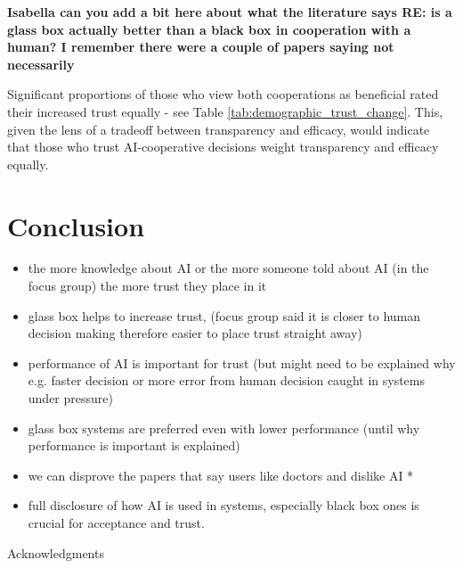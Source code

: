 \documentclass[manuscript,screen,review]{acmart}
\begin{document}
\textbf{Isabella can you add a bit here about what the literature says RE: is a glass box actually better than a black box in cooperation with a human? I remember there were a couple of papers saying not necessarily}

Significant proportions of those who view both cooperations as beneficial rated their increased trust equally - see Table \ref{tab:demographic_trust_change}. This, given the lens of a tradeoff between transparency and efficacy, would indicate that those who trust AI-cooperative decisions weight transparency and efficacy equally. 



\newpage
\section{Conclusion}

\begin{itemize}
    \item the more knowledge about AI or the more someone told about AI (in the focus group) the more trust they place in it
    \item glass box helps to increase trust, (focus group said it is closer to human decision making therefore easier to place trust straight away)
    \item performance of AI is important for trust (but might need to be explained why e.g. faster decision or more error from human decision caught in systems under pressure)
    \item glass box systems are preferred even with lower performance (until why performance is important is explained)
    \item we can disprove the papers that say users like doctors and dislike AI *
    \item full disclosure of how AI is used in systems, especially black box ones is crucial for acceptance and trust.
\end{itemize}



\begin{acks}
Acknowledgments
\end{acks}

\newpage


\end{document}
